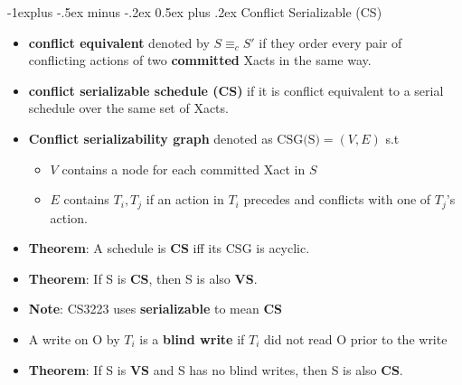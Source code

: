 \documentclass[10pt, landscape]{article}
\makeatletter
\renewcommand{\subsection}{\@startsection{subsection}{2}{0mm}%
  {-1explus -.5ex minus -.2ex}%
  {0.5ex plus .2ex}%
{\normalfont\normalsize\bfseries}}
\makeatother
\begin{document}
\begin{multicols*}{4}
  \subsection{Conflict Serializable (CS)}
  \begin{itemize}
    \item \textbf{conflict equivalent} denoted by $S \equiv_c S'$ if they order every pair of conflicting actions of two \textbf{committed} Xacts in the same way.
    \item \textbf{conflict serializable schedule (CS)} if it is conflict equivalent to a serial schedule over the same set of Xacts.
    \item \textbf{Conflict serializability graph} denoted as $\text{CSG(S)} = (V, E)$ s.t
    \begin{itemize}
      \item $V$ contains a node for each committed Xact in $S$
      \item $E$ contains $T_i, T_j$ if an action in $T_i$ precedes and conflicts with one of $T_j$'s action.
    \end{itemize}
    \item \textbf{Theorem}: A schedule is \textbf{CS} iff its $\text{CSG}$ is acyclic.
    \item \textbf{Theorem}: If S is \textbf{CS}, then S is also \textbf{VS}.
    \item \textbf{Note}: CS3223 uses \textbf{serializable} to mean \textbf{CS}
    \item A write on O by $T_i$ is a \textbf{blind write} if $T_i$ did not read O prior to the write
    \item \textbf{Theorem}: If S is \textbf{VS} and S has no blind writes, then S is also \textbf{CS}.
  \end{itemize}


\end{multicols*}
\end{document}
